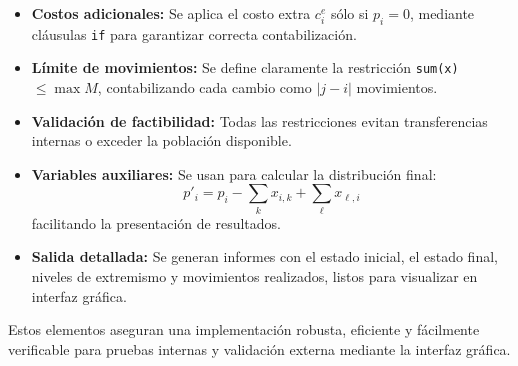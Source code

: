 \documentclass[11pt,letter]{article}
\begin{document}
\begin{itemize}
  \item \textbf{Costos adicionales:} Se aplica el costo extra $c^e_i$ sólo si $p_i=0$, mediante cláusulas \texttt{if} para garantizar correcta contabilización.
  \item \textbf{Límite de movimientos:} Se define claramente la restricción \texttt{sum(x)} $\le\max M$, contabilizando cada cambio como $|j-i|$ movimientos.
  \item \textbf{Validación de factibilidad:} Todas las restricciones evitan transferencias internas o exceder la población disponible.
  \item \textbf{Variables auxiliares:} Se usan para calcular la distribución final:
    \[
      p'_i = p_i - \sum_k x_{i,k} + \sum_\ell x_{\ell,i}
    \]
    facilitando la presentación de resultados.
  \item \textbf{Salida detallada:} Se generan informes con el estado inicial, el estado final, niveles de extremismo y movimientos realizados, listos para visualizar en interfaz gráfica.
\end{itemize}

Estos elementos aseguran una implementación robusta, eficiente y fácilmente verificable para pruebas internas y validación externa mediante la interfaz gráfica.
\end{document}
